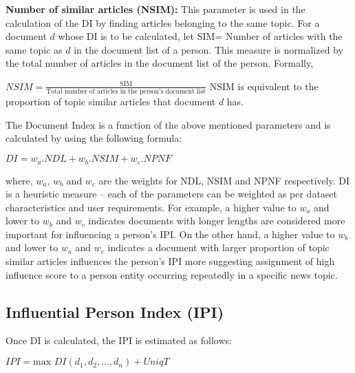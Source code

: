 \noindent \textbf{Number of similar articles (NSIM): }
This parameter is used in the calculation of the DI by finding articles belonging to the same topic. 
For a document $d$ whose DI is to be calculated, let  SIM= Number of articles with the same topic as $d$ in the document list of a person.
This measure is normalized by the total number of articles in the document list of the person. Formally,

$NSIM= \frac{\text{SIM}} {\text{Total number of articles in the person's document list}}$
NSIM is equivalent to the proportion of topic similar articles that document $d$ has.

The Document Index is a function of the above mentioned parameters and is calculated by using the following formula:
\begin{center}

			$DI = w_a . NDL + w_b . NSIM + w_c . NPNF $
\end{center}
where, $w_a$, $ w_b$ and $w_c$ are the weights for NDL, NSIM and NPNF respectively.
DI is a heuristic measure -- each of the parameters can be weighted as per dataset characteristics and user requirements. For example, a higher value to $w_a$ and lower to $w_b$ and $w_c$ indicates documents with longer lengths are considered more important for influencing a person's IPI. On the other hand, a higher value to $w_b$ and lower to $w_a$ and $w_c$ indicates a document with larger proportion of topic similar articles influences the person's IPI more suggesting assignment of high influence score to a person entity occurring repeatedly in a specific news topic.  

\subsection{Influential Person Index (IPI)}

Once DI is calculated, the IPI is estimated as follows:
		
\begin{center}
$IPI= \text{max } DI(d_1, d_2, ...,d_n)+ UniqT$
\end{center}

